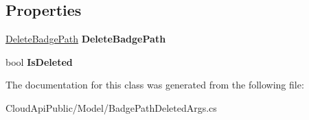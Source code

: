 \subsection*{Properties}
\begin{DoxyCompactItemize}
\item 
\hypertarget{class_cloud_api_public_1_1_model_1_1_badge_path_deleted_args_a93e16e54bc84a46518ebc36b8af605bd}{\hyperlink{struct_cloud_api_public_1_1_model_1_1_delete_badge_path}{Delete\-Badge\-Path} {\bfseries Delete\-Badge\-Path}}\label{class_cloud_api_public_1_1_model_1_1_badge_path_deleted_args_a93e16e54bc84a46518ebc36b8af605bd}

\item 
\hypertarget{class_cloud_api_public_1_1_model_1_1_badge_path_deleted_args_a539f27d75db2190c1d90505feca9d4f1}{bool {\bfseries Is\-Deleted}}\label{class_cloud_api_public_1_1_model_1_1_badge_path_deleted_args_a539f27d75db2190c1d90505feca9d4f1}

\end{DoxyCompactItemize}


The documentation for this class was generated from the following file\-:\begin{DoxyCompactItemize}
\item 
Cloud\-Api\-Public/\-Model/Badge\-Path\-Deleted\-Args.\-cs\end{DoxyCompactItemize}

